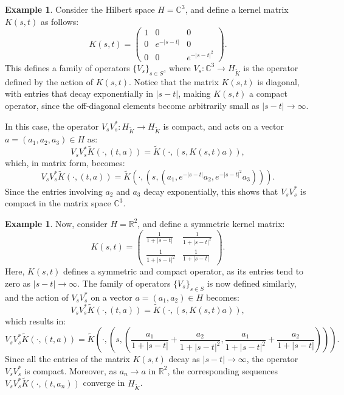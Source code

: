 \documentclass[11pt]{amsart}
\theoremstyle{definition}
\newtheorem{example}[theorem]{Example}
\numberwithin{equation}{section}
\begin{document}
\begin{example}

Consider the Hilbert space \( H = \mathbb{C}^3 \), and define a kernel matrix \( K(s,t) \) as follows:
\[
K(s,t) = \begin{pmatrix}
1 & 0 & 0 \\
0 & e^{-|s - t|} & 0 \\
0 & 0 & e^{-|s - t|^2}
\end{pmatrix}.
\]
This defines a family of operators \( \{V_s\}_{s \in S} \), where \( V_s: \mathbb{C}^3 \to H_{\tilde{K}} \) is the operator defined by the action of \( K(s,t) \). Notice that the matrix \( K(s,t) \) is diagonal, with entries that decay exponentially in \( |s - t| \), making \( K(s,t) \) a compact operator, since the off-diagonal elements become arbitrarily small as \( |s - t| \to \infty \).

In this case, the operator \( V_s V_s^*: H_{\tilde{K}} \to H_{\tilde{K}} \) is compact, and acts on a vector \( a = (a_1, a_2, a_3) \in H \) as:
\[
V_s V_s^* \tilde{K}(\cdot, (t, a)) = \tilde{K}(\cdot, (s, K(s,t) a)),
\]
which, in matrix form, becomes:
\[
V_s V_s^* \tilde{K}(\cdot, (t, a)) = \tilde{K}(\cdot, (s, (a_1, e^{-|s - t|} a_2, e^{-|s - t|^2} a_3))).
\]
Since the entries involving \( a_2 \) and \( a_3 \) decay exponentially, this shows that \( V_s V_s^* \) is compact in the matrix space \( \mathbb{C}^3 \).
\end{example}

\begin{example}
Now, consider \( H = \mathbb{R}^2 \), and define a symmetric kernel matrix:
\[
K(s,t) = \begin{pmatrix}
\frac{1}{1 + |s - t|} & \frac{1}{1 + |s - t|^2} \\
\frac{1}{1 + |s - t|^2} & \frac{1}{1 + |s - t|}
\end{pmatrix}.
\]
Here, \( K(s,t) \) defines a symmetric and compact operator, as its entries tend to zero as \( |s - t| \to \infty \). The family of operators \( \{V_s\}_{s \in S} \) is now defined similarly, and the action of \( V_s V_s^* \) on a vector \( a = (a_1, a_2) \in H \) becomes:
\[
V_s V_s^* \tilde{K}(\cdot, (t, a)) = \tilde{K}(\cdot, (s, K(s,t) a)),
\]
which results in:
\[
V_s V_s^* \tilde{K}(\cdot, (t, a)) = \tilde{K}(\cdot, (s, \left( \frac{a_1}{1 + |s - t|} + \frac{a_2}{1 + |s - t|^2}, \frac{a_1}{1 + |s - t|^2} + \frac{a_2}{1 + |s - t|} \right))).
\]
Since all the entries of the matrix \( K(s,t) \) decay as \( |s - t| \to \infty \), the operator \( V_s V_s^* \) is compact. Moreover, as \( a_n \to a \) in \( \mathbb{R}^2 \), the corresponding sequences \( V_s V_s^* \tilde{K}(\cdot, (t, a_n)) \) converge in \( H_{\tilde{K}} \).
\end{example}
\end{document}
